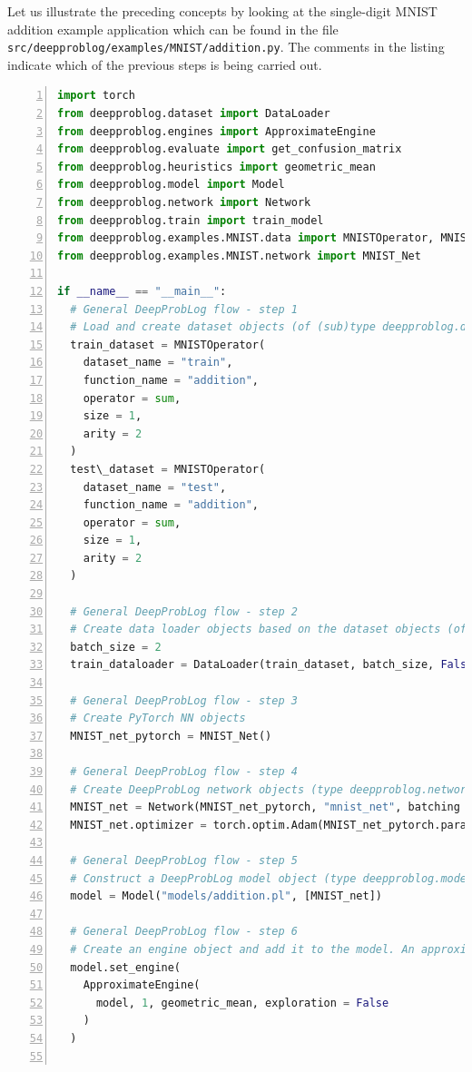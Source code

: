 Let us illustrate the preceding concepts by looking at the single-digit MNIST addition example application which can be found in the file \texttt{src/deepproblog/examples/MNIST/addition.py}. The comments in the listing indicate which of the previous steps is being carried out.
\begin{lstlisting}[language=Python, caption={src/deepproblog/examples/MNIST/basic\_addition.py, the basic MNIST single-digit addition example}, numbers=left, label={lst:MNIST_addition_source_code}, captionpos=b]
import torch
from deepproblog.dataset import DataLoader
from deepproblog.engines import ApproximateEngine
from deepproblog.evaluate import get_confusion_matrix
from deepproblog.heuristics import geometric_mean
from deepproblog.model import Model
from deepproblog.network import Network
from deepproblog.train import train_model
from deepproblog.examples.MNIST.data import MNISTOperator, MNIST_train, MNIST_test
from deepproblog.examples.MNIST.network import MNIST_Net
  
if __name__ == "__main__":
  # General DeepProbLog flow - step 1
  # Load and create dataset objects (of (sub)type deepproblog.dataset.Dataset)
  train_dataset = MNISTOperator(
    dataset_name = "train",
    function_name = "addition",
    operator = sum,
    size = 1,
    arity = 2
  )
  test\_dataset = MNISTOperator(
    dataset_name = "test",
    function_name = "addition",
    operator = sum,
    size = 1,
    arity = 2
  )
  
  # General DeepProbLog flow - step 2
  # Create data loader objects based on the dataset objects (of (sub)type deepproblog.dataset.DataLoader)
  batch_size = 2
  train_dataloader = DataLoader(train_dataset, batch_size, False)
  
  # General DeepProbLog flow - step 3
  # Create PyTorch NN objects
  MNIST_net_pytorch = MNIST_Net()
  
  # General DeepProbLog flow - step 4
  # Create DeepProbLog network objects (type deepproblog.network.Network) based on the PyTorch NNs
  MNIST_net = Network(MNIST_net_pytorch, "mnist_net", batching = True)
  MNIST_net.optimizer = torch.optim.Adam(MNIST_net_pytorch.parameters(), lr = 1e-3)
  
  # General DeepProbLog flow - step 5
  # Construct a DeepProbLog model object (type deepproblog.model.Model) based on the KB file and the DeepProbLog Network objects
  model = Model("models/addition.pl", [MNIST_net])
  
  # General DeepProbLog flow - step 6
  # Create an engine object and add it to the model. An approximate (class deepproblog.engines.ApproximateEngine) and exact (deepproblog.engines.ExactEngine) inference engine are provided in the standard DeepProbLog distribution. Both engines have cases in which they are or are not appropriate.
  model.set_engine(
    ApproximateEngine(
      model, 1, geometric_mean, exploration = False
    )
  )
  

\end{lstlisting}
